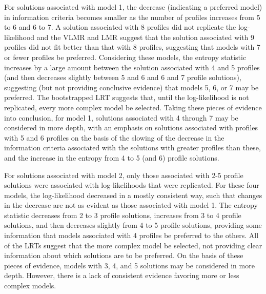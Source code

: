 \documentclass[]{msu-thesis}
\theoremstyle{definition}
\theoremstyle{definition}
\theoremstyle{definition}
\theoremstyle{remark}
\begin{document}
For solutions associated with model 1, the decrease (indicating a
preferred model) in information criteria becomes smaller as the number
of profiles increases from 5 to 6 and 6 to 7. A solution associated with
8 profiles did not replicate the log-likelihood and the VLMR and LMR
suggest that the solution associated with 9 profiles did not fit better
than that with 8 profiles, suggesting that models with 7 or fewer
profiles be preferred. Considering these models, the entropy statistic
increases by a large amount between the solution associated with 4 and 5
profiles (and then decreases slightly between 5 and 6 and 6 and 7
profile solutions), suggesting (but not providing conclusive evidence)
that models 5, 6, or 7 may be preferred. The bootstrapped LRT suggests
that, until the log-likelihood is not replicated, every more complex
model be selected. Taking these pieces of evidence into conclusion, for
model 1, solutions associated with 4 through 7 may be considered in more
depth, with an emphasis on solutions associated with profiles with 5 and
6 profiles on the basis of the slowing of the decrease in the
information criteria associated with the solutions with greater profiles
than these, and the increase in the entropy from 4 to 5 (and 6) profile
solutions.

For solutions associated with model 2, only those associated with 2-5
profile solutions were associated with log-likelihoods that were
replicated. For these four models, the log-likelihood decreased in a
mostly consistent way, such that changes in the decrease are not as
evident as those associated with model 1. The entropy statistic
decreases from 2 to 3 profile solutions, increases from 3 to 4 profile
solutions, and then decreases slightly from 4 to 5 profile solutions,
providing some information that models associated with 4 profiles be
preferred to the others. All of the LRTs suggest that the more complex
model be selected, not providing clear information about which solutions
are to be preferred. On the basis of these pieces of evidence, models
with 3, 4, and 5 solutions may be considered in more depth. However,
there is a lack of consistent evidence favoring more or less complex
models.
\end{document}
